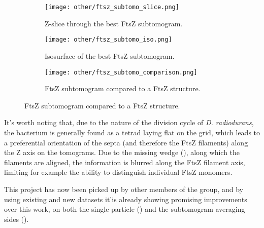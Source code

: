 \begin{figure}[ht]
    \centering
    \begin{subfigure}[B]{.32\textwidth}
        \centering
        \texttt{[image: other/ftsz\_subtomo\_slice.png]}
        \caption{Z-slice through the best FtsZ subtomogram.}
        \label{fig:ftsz_subtomo_slice}
    \end{subfigure}%
    \hfill
    \begin{subfigure}[B]{.32\textwidth}
        \centering
        \texttt{[image: other/ftsz\_subtomo\_iso.png]}
        \caption{Isosurface of the best FtsZ subtomogram.}
        \label{fig:ftsz_subtomo_iso}
    \end{subfigure}%
    \hfill
    \begin{subfigure}[B]{.32\textwidth}
        \centering
        \texttt{[image: other/ftsz\_subtomo\_comparison.png]}
        \caption{FtsZ subtomogram compared to a FtsZ structure.}
        \label{fig:ftsz_subtomo_iso_struct}
    \end{subfigure}%
    \label{fig:ftsz_subtomo}
\end{figure}

It's worth noting that, due to the nature of the division cycle of \textit{D. radiodurans}, the bacterium is generally found as a tetrad laying flat on the grid, which leads to a preferential orientation of the septa (and therefore the FtsZ filaments) along the Z axis on the tomograms.
Due to the missing wedge (), along which the filaments are aligned, the information is blurred along the FtsZ filament axis, limiting for example the ability to distinguish individual FtsZ monomers.

\bigskip

This project has now been picked up by other members of the group, and by using existing and new datasets it'is already showing promising improvements over this work, on both the single particle () and the subtomogram averaging sides ().

